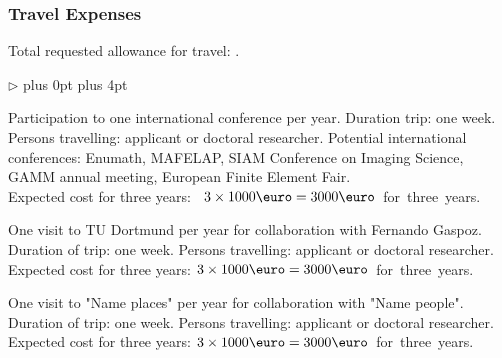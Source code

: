\documentclass[enabledeprecatedfontcommands,cleardoublepage=empty,headsepline,twoside,11pt,DIV=15,BCOR=12mm,final]{scrartcl}
\renewenvironment{itemize}
{\begin{list}{$\triangleright$}{\labelwidth-2mm \leftmargin3mm %
  \itemsep5pt plus 0pt  \topsep3pt \parsep1pt plus 4pt \labelsep2mm}}
{\end{list}}
\begin{document}
\subsubsection{Travel Expenses}

Total requested allowance for travel: .
\begin{itemize}\itemsep=-1pt
\item Participation to one international conference per year. Duration trip: one week. Persons travelling: applicant  or doctoral researcher. Potential international conferences: Enumath, MAFELAP,  SIAM Conference on Imaging Science, GAMM annual meeting, European Finite Element Fair. \\
Expected cost for three years: \dotfill\hbox{ $3 \times 1000 \text{\euro}=3000\text{\euro}$ for three years.}

  \item One visit to TU Dortmund per year for collaboration with Fernando Gaspoz.
Duration of trip: one week. Persons travelling: applicant or doctoral researcher.\\
 Expected cost for three years:  \dotfill\hbox{$3 \times 1000 \text{\euro}=3000\text{\euro}$ for three years.}
 
\item One visit to "Name places" per year for collaboration with "Name people". Duration of trip: one week. Persons travelling: applicant or doctoral researcher.\\
Expected cost for three years:  \dotfill\hbox{$3 \times 1000 \text{\euro}=3000\text{\euro}$ for three years.}
\end{itemize}
\end{document}
